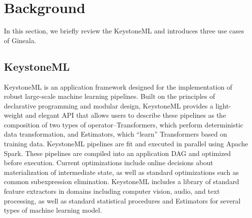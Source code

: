 \documentclass{sig-alternate}
\begin{document}
\section{Background}
\label{sec:Background}
In this section, we briefly review the KeystoneML and introduces three use cases of Gineala.

\subsection{KeystoneML}
KeystoneML is an application framework designed for the implementation of robust large-scale machine learning pipelines. Built on the principles of declarative programming and modular design, KeystoneML provides a light-weight and elegant API that allows users to describe these pipelines as the composition of two types of operator--Transformers, which perform deterministic data transformation, and Estimators, which ``learn'' Transformers based on training data. KeystoneML pipelines are fit and executed in parallel using Apache Spark. These pipelines are compiled into an application DAG and optimized before execution. Current optimizations include online decisions about materialization of intermediate state, as well as standard optimizations such as common subexpression elimination. KeystoneML includes a library of standard feature extractors in domains including computer vision, audio, and text processing, as well as standard statistical procedures and Estimators for several types of machine learning model.
\end{document}
